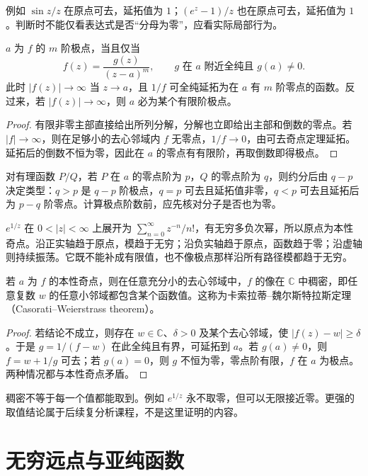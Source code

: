 例如 $\sin z/z$ 在原点可去，延拓值为 $1$；$(e^z-1)/z$ 也在原点可去，延拓值为 $1$。判断时不能仅看表达式是否“分母为零”，应看实际局部行为。

\begin{proposition}[极点判别]
\label{prop:ca-pole}
$a$ 为 $f$ 的 $m$ 阶极点，当且仅当
\[
 f(z)=\frac{g(z)}{(z-a)^m},\qquad g\text{ 在 }a\text{ 附近全纯且 }g(a)\ne0.
\]
此时 $|f(z)|\to\infty$ 当 $z\to a$，且 $1/f$ 可全纯延拓为在 $a$ 有 $m$ 阶零点的函数。反过来，若 $|f(z)|\to\infty$，则 $a$ 必为某个有限阶极点。
\end{proposition}
\begin{proof}
有限非零主部直接给出所列分解，分解也立即给出主部和倒数的零点。若 $|f|\to\infty$，则在足够小的去心邻域内 $f$ 无零点，$1/f\to0$，由可去奇点定理延拓。延拓后的倒数不恒为零，因此在 $a$ 的零点有有限阶，再取倒数即得极点。
\end{proof}

对有理函数 $P/Q$，若 $P$ 在 $a$ 的零点阶为 $p$，$Q$ 的零点阶为 $q$，则约分后由 $q-p$ 决定类型：$q>p$ 是 $q-p$ 阶极点，$q=p$ 可去且延拓值非零，$q<p$ 可去且延拓后为 $p-q$ 阶零点。计算极点阶数前，应先核对分子是否也为零。

\begin{example}[本性奇点的典型行为]
$e^{1/z}$ 在 $0<|z|<\infty$ 上展开为 $\sum_{n=0}^\infty z^{-n}/n!$，有无穷多负次幂，所以原点为本性奇点。沿正实轴趋于原点，模趋于无穷；沿负实轴趋于原点，函数趋于零；沿虚轴则持续振荡。它既不能补成有限值，也不像极点那样沿所有路径模都趋于无穷。
\end{example}

\begin{theorem}[本性奇点附近的稠密性]
\label{thm:ca-casorati}
若 $a$ 为 $f$ 的本性奇点，则在任意充分小的去心邻域中，$f$ 的像在 $\mathbb C$ 中稠密，即任意复数 $w$ 的任意小邻域都包含某个函数值。这称为卡索拉蒂--魏尔斯特拉斯定理（Casorati--Weierstrass theorem）。
\end{theorem}
\begin{proof}
若结论不成立，则存在 $w\in\mathbb C$、$\delta>0$ 及某个去心邻域，使 $|f(z)-w|\ge\delta$。于是 $g=1/(f-w)$ 在此全纯且有界，可延拓到 $a$。若 $g(a)\ne0$，则 $f=w+1/g$ 可去；若 $g(a)=0$，则 $g$ 不恒为零，零点阶有限，$f$ 在 $a$ 为极点。两种情况都与本性奇点矛盾。
\end{proof}

稠密不等于每一个值都能取到。例如 $e^{1/z}$ 永不取零，但可以无限接近零。更强的取值结论属于后续复分析课程，不是这里证明的内容。

\section{无穷远点与亚纯函数}

